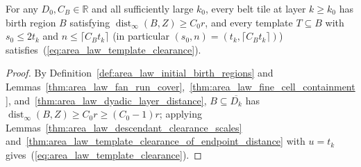 \begin{lemma}
    \label{thm:area_law_belt_birth_template_clearance}
    \leanok
    For any $D_0,C_B\in\mathbb R$ and all sufficiently large $k_0$, every belt
    tile at layer $k\ge k_0$ has birth region $B$ satisfying
    $\operatorname{dist}_\infty(B,Z)\ge C_0r$, and every template $T\subseteq B$
    with $s_0\le2t_k$ and $n\le\lceil C_Bt_k\rceil$ (in particular
    $(s_0,n)=(t_k,\lceil C_Bt_k\rceil)$) satisfies~(\ref{eq:area_law_template_clearance}).
\end{lemma}
\begin{proof}\leanok
    By Definition~\ref{def:area_law_initial_birth_regions} and
    Lemmas~\ref{thm:area_law_fan_run_cover},~\ref{thm:area_law_fine_cell_containment},
    and~\ref{thm:area_law_dyadic_layer_distance}, $B\subseteq\overline{D_k}$ has
    $\operatorname{dist}_\infty(B,Z)\ge C_0r\ge(C_0-1)r$; applying
    Lemmas~\ref{thm:area_law_descendant_clearance_scales}
    and~\ref{thm:area_law_template_clearance_of_endpoint_distance} with
    $u=t_k$ gives~(\ref{eq:area_law_template_clearance}).
\end{proof}

